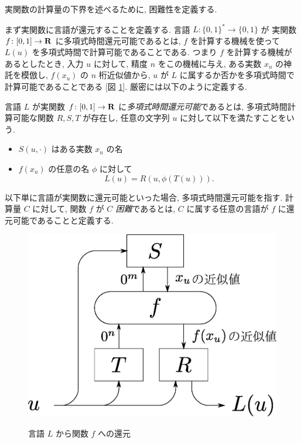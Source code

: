  実関数の計算量の下界を述べるために, 困難性を定義する.

 まず実関数に言語が還元することを定義する.
 言語 $L \colon \{0, 1\} ^* \to \{0, 1\}$ が
 実関数 $f\colon [0,1] \to \mathbf R$ に多項式時間還元可能であるとは,
 $f$ を計算する機械を使って $L(u)$ を多項式時間で計算可能であることである.
 つまり $f$ を計算する機械があるとしたとき, 入力 $u$ に対して,
 精度 $n$ をこの機械に与え, ある実数 $x_u$ の神託を模倣し, $f(x_u)$ の $n$ 桁近似値から,
 $u$ が $L$ に属するか否かを多項式時間で計算可能であることである
 [図 \ref{fig:reduction}].
 厳密には以下のように定義する.

 \begin{definition}[多項式時間還元可能]
  言語 $L$ が実関数 $f\colon [0,1] \to \mathbf R$ に\emph{多項式時間還元可能}であるとは, 
  多項式時間計算可能な関数 $R,S,T$ が存在し, 
  任意の文字列 $u$ に対して以下を満たすことをいう. 
  \begin{itemize}
   \item $S(u, \cdot)$ はある実数 $x_u$ の名
   \item $f(x_u)$ の任意の名 $\phi$ に対して
	 \[
	  L(u) = R(u, \phi(T(u))).
	 \]
  \end{itemize}
 \end{definition}
 以下単に言語が実関数に還元可能といった場合, 多項式時間還元可能を指す.
 計算量 $C$ に対して, 関数 $f$ が \emph{$C$ 困難}であるとは,
 $C$ に属する任意の言語が $f$ に還元可能であることと定義する.

 \begin{figure}
  \begin{center}
  \label{fig:reduction}
  \includegraphics[scale=0.25]{image/reduction.eps}
  \caption{言語 $L$ から関数 $f$ への還元}
  \end{center}
 \end{figure}



